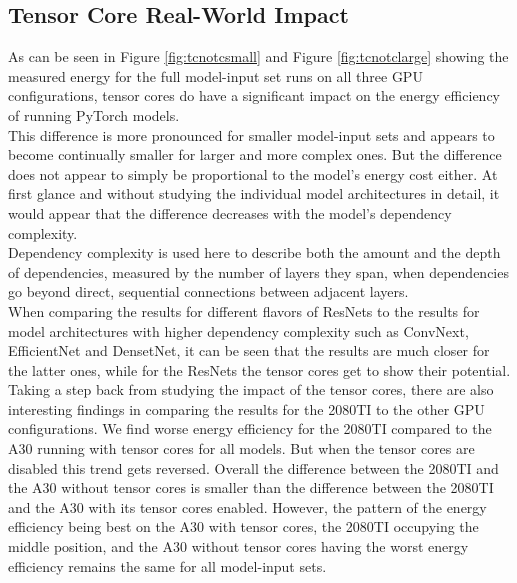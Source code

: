 



\setcounter{page}{\numexpr\value{savedpage}+3\relax}


\subsection{Tensor Core Real-World Impact}
As can be seen in Figure \ref{fig:tcnotcsmall} and Figure \ref{fig:tcnotclarge} showing the measured energy for the full model-input set runs on all three GPU configurations, tensor cores do have a significant impact on the energy efficiency of running PyTorch models. \\
This difference is more pronounced for smaller model-input sets and appears to become continually smaller for larger and more complex ones. But the difference does not appear to simply be proportional to the model's energy cost either. At first glance and without studying the individual model architectures in detail, it would appear that the difference decreases with the model's dependency complexity. \\
Dependency complexity is used here to describe both the amount and the depth of dependencies, measured by the number of layers they span, when dependencies go beyond direct, sequential connections between adjacent layers.\\
When comparing the results for different flavors of ResNets to the results for model architectures with higher dependency complexity such as ConvNext, EfficientNet and DensetNet, it can be seen that the results are much closer for the latter ones, while for the ResNets the tensor cores get to show their potential. \\
Taking a step back from studying the impact of the tensor cores, there are also interesting findings in comparing the results for the 2080TI to the other GPU configurations. We find worse energy efficiency for the 2080TI compared to the A30 running with tensor cores for all models. But when the tensor cores are disabled this trend gets reversed. Overall the difference between the 2080TI and the A30 without tensor cores is smaller than the difference between the 2080TI and the A30 with its tensor cores enabled. However, the pattern of the energy efficiency being best on the A30 with tensor cores, the 2080TI occupying the middle position, and the A30 without tensor cores having the worst energy efficiency remains the same for all model-input sets.


